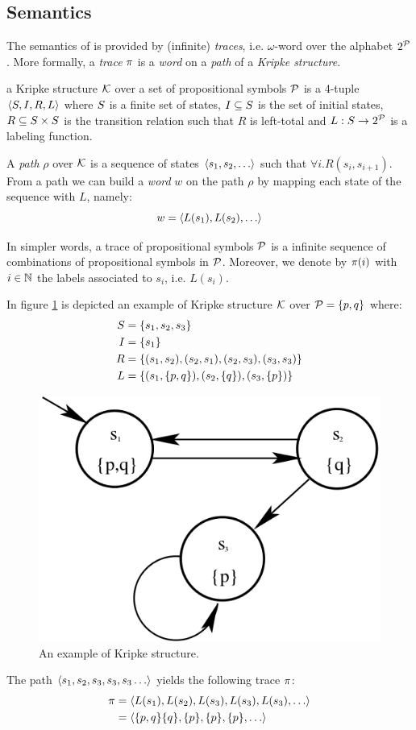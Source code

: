 \subsection{Semantics}
The semantics of \LTL is provided by (infinite) \textit{traces}, i.e. $\omega$-word over the alphabet $2^{\mathcal{P}}$. More formally, a \emph{trace} $\pi$ is a \emph{word} on a \emph{path} of a \emph{Kripke structure}.
\begin{definition}\label{kripke}
	a Kripke structure $\mathcal{K}$ over a set of propositional symbols $\mathcal{P}$ is a 4-tuple $\langle S, I, R, L \rangle$ where $S$ is a finite set of states, $I\subseteq S$ is the set of initial states, $R \subseteq S \times S$ is the transition relation such that $R$ is left-total and $L: S \to 2^{\mathcal{P}}$ is a labeling function.
\end{definition}
A \emph{path} $\rho$ over $\mathcal{K}$ is a sequence of states $\tup{s_1, s_2, \dots}$ such that $\forall i. R(s_i, s_{i+1})$. From a path we can build a \emph{word} $w$ on the path $\rho$ by  
mapping each state of the sequence with $L$, namely:
\[
w = \tup{L(s_1), L(s_2), \dots}
\]

In simpler words, a trace of propositional symbols $\mathcal{P}$ is a infinite sequence of combinations of propositional symbols in $\mathcal{P}$. Moreover, we denote by $\pi(i)$ with $i\in\mathbb{N}$ the labels associated to $s_i$, i.e. $L(s_i)$.
\begin{example}
In figure \ref{kripke-example} is depicted an example of Kripke structure $\mathcal{K}$ over $\mathcal{P} = \{p, q\}$ where:
\begin{align*}
S &= \{s_1, s_2, s_3\}\\
I &= \{s_1\}\\
R &= \{(s_1, s_2), (s_2, s_1), (s_2, s_3), (s_3, s_3)\}\\
L &= \{(s_1, \{p, q\}), (s_2, \{q\}), (s_3, \{p\})\}
\end{align*}
 
\begin{figure}[h]
	\centering	
	\includegraphics[width=.5\linewidth]{images/KripkeStructureExample}
	\caption{\label{kripke-example}An example of Kripke structure.}
\end{figure}

The path $\tup{s_1, s_2, s_3, s_3, s_3\dots}$ yields the following trace $\pi$:
\begin{align*}
\trace &= \tup{L(s_1), L(s_2), L(s_3), L(s_3), L(s_3),\dots} \\
	&= \tup{\set{p, q}\set{q}, \set{p}, \set{p},\set{p}, \dots}
\end{align*}
\end{example}



